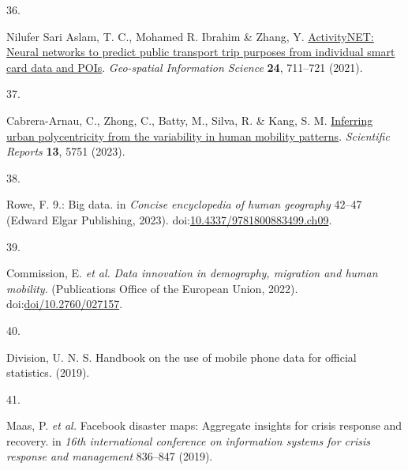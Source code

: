 \documentclass[
  11pt,
]{article}
\newlength{\cslhangindent}
\newlength{\csllabelwidth}
\newlength{\cslentryspacingunit} %
\newenvironment{CSLReferences}[2] %
 {%
  \setlength{\parindent}{0pt}
  \ifodd #1
  \let\oldpar\par
  \def\par{\hangindent=\cslhangindent\oldpar}
  \fi
  \setlength{\parskip}{#2\cslentryspacingunit}
 }%
 {}
\newcommand{\CSLLeftMargin}[1]{\parbox[t]{\csllabelwidth}{#1}}
\newcommand{\CSLRightInline}[1]{\parbox[t]{\linewidth - \csllabelwidth}{#1}\break}
\begin{document}
\begin{CSLReferences}{0}{0}
\leavevmode{}%
\CSLLeftMargin{36. }%
\CSLRightInline{Nilufer Sari Aslam, T. C., Mohamed R. Ibrahim \& Zhang,
Y. \href{https://doi.org/10.1080/10095020.2021.1985943}{ActivityNET:
Neural networks to predict public transport trip purposes from
individual smart card data and POIs}. \emph{Geo-spatial Information
Science} \textbf{24}, 711--721 (2021).}

\leavevmode{}%
\CSLLeftMargin{37. }%
\CSLRightInline{Cabrera-Arnau, C., Zhong, C., Batty, M., Silva, R. \&
Kang, S. M. \href{https://doi.org/10.1038/s41598-023-33003-7}{Inferring
urban polycentricity from the variability in human mobility patterns}.
\emph{Scientific Reports} \textbf{13}, 5751 (2023).}

\leavevmode{}%
\CSLLeftMargin{38. }%
\CSLRightInline{Rowe, F. 9.: Big data. in \emph{Concise encyclopedia of
human geography} 42--47 (Edward Elgar Publishing, 2023).
doi:\href{https://doi.org/10.4337/9781800883499.ch09}{10.4337/9781800883499.ch09}.}

\leavevmode{}%
\CSLLeftMargin{39. }%
\CSLRightInline{Commission, E. \emph{et al.} \emph{Data innovation in
demography, migration and human mobility}. (Publications Office of the
European Union, 2022).
doi:\href{https://doi.org/doi/10.2760/027157}{doi/10.2760/027157}.}

\leavevmode{}%
\CSLLeftMargin{40. }%
\CSLRightInline{Division, U. N. S. Handbook on the use of mobile phone
data for official statistics. (2019).}

\leavevmode{}%
\CSLLeftMargin{41. }%
\CSLRightInline{Maas, P. \emph{et al.} Facebook disaster maps: Aggregate
insights for crisis response and recovery. in \emph{16th international
conference on information systems for crisis response and management}
836--847 (2019).}

\end{CSLReferences}
\end{document}
